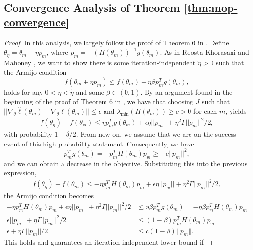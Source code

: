 \subsection{Convergence Analysis of Theorem \ref{thm:mop-convergence}}

\begin{proof}
In this analysis, we largely follow the proof of Theorem 6 in \cite{mahoney16}.
Define $\theta_\eta = \theta_m + \eta p_m$, where $p_m=-(H(\theta_m))^{-1}g(\theta_m)$. 
As in Roosta-Khorasani and Mahoney \cite{mahoney16}, we want to show there is some iteration-independent $\tilde{\eta}>0$ such that the Armijo condition
\begin{equation}
    f(\theta_m+\eta p_m) \leq f(\theta_m) + \eta\beta p_m^Tg(\theta_m),
\end{equation}
holds for any $0< \eta < \tilde{\eta}$ and some $\beta \in (0,1)$.
By an argument found in the beginning of the proof of Theorem 6 in \cite{mahoney16}, we have that choosing $J$ such that $||\nabla_\theta\hat{\ell}(\theta_m) - \nabla_\theta \ell(\theta_m)|| \leq \epsilon$ and $\lambda_{\min}(H(\theta_m)) \geq c>0$ for each $m$, yields
\begin{align}
    f(\theta_\eta)-f(\theta_m) \leq \eta p_m^Tg(\theta_m) + \epsilon\eta||p_m|| + \eta^2 \Gamma ||p_m||^2 / 2,
\end{align}
with probability $1-\delta/2$. 
From now on, we assume that we are on the success event of this high-probability statement. 
Consequently, we have
\begin{equation}
    p_m^Tg(\theta_m) = -p_m^TH(\theta_m)p_m \geq -c||p_m||^2,
\end{equation}
and we can obtain a decrease in the objective. 
Substituting this into the previous expression,
\begin{align}
    f(\theta_\eta)-f(\theta_m) \leq -\eta p_m^TH(\theta_m)p_m + \epsilon\eta||p_m|| + \eta^2 \Gamma ||p_m||^2 / 2,
\end{align}
the Armijo condition becomes
\begin{align}
    -\eta p_m^TH(\theta_m)p_m + \epsilon\eta||p_m|| + \eta^2 \Gamma ||p_m||^2 / 2 &\leq \eta \beta p_m^Tg(\theta_m) = - \eta \beta p_m^TH(\theta_m)p_m \\
    \epsilon||p_m|| + \eta \Gamma ||p_m||^2 / 2 &\leq (1- \beta) p_m^TH(\theta_m)p_m \\
    \epsilon + \eta \Gamma ||p_m|| / 2 &\leq c(1- \beta) ||p_m||.
\end{align}
This holds and guarantees an iteration-independent lower bound if 

\end{proof}

